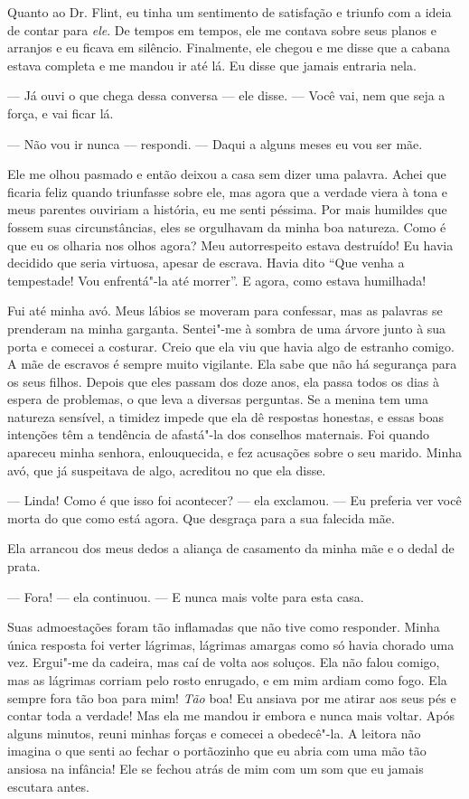 Quanto ao Dr. Flint, eu tinha um
sentimento de satisfação e triunfo com a ideia de contar para
\emph{ele}. De tempos em tempos, ele me contava sobre seus planos e
arranjos e eu ficava em silêncio. Finalmente, ele chegou e me disse que
a cabana estava completa e me mandou ir até lá. Eu disse que jamais
entraria nela.

--- Já ouvi o que chega dessa conversa --- ele disse. --- Você vai, nem
que seja a força, e vai ficar lá.

--- Não vou ir nunca --- respondi. ---
Daqui a alguns meses eu vou ser mãe.

Ele me olhou pasmado e então deixou a
casa sem dizer uma palavra. Achei que ficaria feliz quando triunfasse
sobre ele, mas agora que a verdade viera à tona e meus parentes ouviriam
a história, eu me senti péssima. Por mais humildes que fossem suas
circunstâncias, eles se orgulhavam da minha boa natureza. Como é que eu
os olharia nos olhos agora? Meu autorrespeito estava destruído! Eu havia
decidido que seria virtuosa, apesar de escrava. Havia dito ``Que venha a
tempestade! Vou enfrentá"-la até morrer''. E agora, como estava
humilhada!

Fui até minha avó. Meus lábios se
moveram para confessar, mas as palavras se prenderam na minha garganta.
Sentei"-me à sombra de uma árvore junto à sua porta e comecei a costurar.
Creio que ela viu que havia algo de estranho comigo. A mãe de escravos é
sempre muito vigilante. Ela sabe que não há segurança para os seus
filhos. Depois que eles passam dos doze anos, ela passa todos os dias à
espera de problemas, o que leva a diversas perguntas. Se a menina tem
uma natureza sensível, a timidez impede que ela dê respostas honestas, e
essas boas intenções têm a tendência de afastá"-la dos conselhos
maternais. Foi quando apareceu minha senhora, enlouquecida, e fez
acusações sobre o seu marido. Minha avó, que já suspeitava de algo,
acreditou no que ela disse.

--- Linda! Como é que isso foi acontecer? --- ela exclamou. --- Eu
preferia ver você morta do que como está agora. Que desgraça para a sua
falecida mãe.

Ela arrancou dos meus dedos a aliança de casamento da minha mãe e o
dedal de prata.

--- Fora! --- ela continuou. --- E nunca mais volte para esta casa.

Suas admoestações foram tão inflamadas que não tive como responder.
Minha única resposta foi verter lágrimas, lágrimas amargas como só havia
chorado uma vez. Ergui"-me da cadeira, mas caí de volta aos soluços. Ela
não falou comigo, mas as lágrimas corriam pelo rosto enrugado, e em mim
ardiam como fogo. Ela sempre fora tão boa para mim! \emph{Tão} boa! Eu
ansiava por me atirar aos seus pés e contar toda a verdade! Mas ela me
mandou ir embora e nunca mais voltar. Após alguns minutos, reuni minhas
forças e comecei a obedecê"-la. A leitora não imagina o que senti ao
fechar o portãozinho que eu abria com uma mão tão ansiosa na infância!
Ele se fechou atrás de mim com um som que eu jamais escutara antes.

